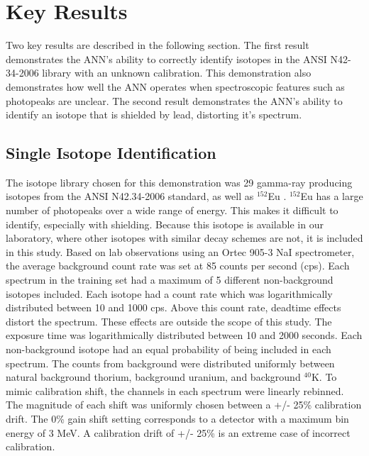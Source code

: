 \documentclass[tocnosub,noragright,centerchapter,12pt,fullpage]{uiucecethesis09}
\begin{document}


\section{Key Results}

Two key results are described in the following section. The first result demonstrates the ANN's ability to correctly identify isotopes in the ANSI N42-34-2006 library with an unknown calibration. This demonstration also demonstrates how well the ANN operates when spectroscopic features such as photopeaks are unclear. The second result demonstrates the ANN's ability to identify an isotope that is shielded by lead, distorting it's spectrum.  

\subsection{Single Isotope Identification}

The isotope library chosen for this demonstration was 29 gamma-ray producing isotopes from the ANSI N42.34-2006 standard, as well as $^{152}$Eu \cite{ANSI}. $^{152}$Eu has a large number of photopeaks over a wide range of energy. This makes it difficult to identify, especially with shielding. Because this isotope is available in our laboratory, where other isotopes with similar decay schemes are not, it is included in this study. Based on lab observations using an Ortec 905-3 NaI spectrometer, the average background count rate was set at 85 counts per second (cps). Each spectrum in the training set had a maximum of 5 different non-background isotopes included. Each isotope had a count rate which was logarithmically distributed between 10 and 1000 cps. Above this count rate, deadtime effects distort the spectrum. These effects are outside the scope of this study. The exposure time was logarithmically distributed between 10 and 2000 seconds. Each non-background isotope had an equal probability of being included in each spectrum. The counts from background were distributed uniformly between natural background thorium, background uranium, and background $^{40}$K. To mimic calibration shift, the channels in each spectrum were linearly rebinned. The magnitude of each shift was uniformly chosen between a +/- 25\% calibration drift. The 0\% gain shift setting corresponds to a detector with a maximum bin energy of 3 MeV. A calibration drift of +/- 25\% is an extreme case of incorrect calibration.
\end{document}
